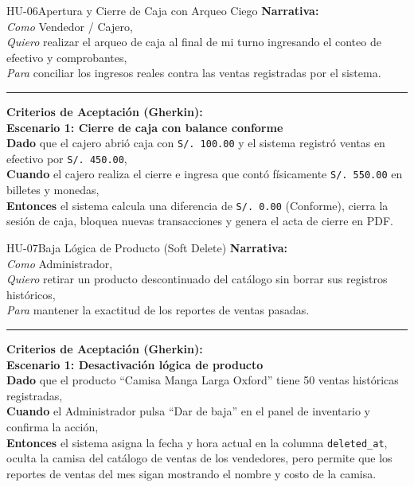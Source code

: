 \begin{hubox}{HU-06}{Apertura y Cierre de Caja con Arqueo Ciego}
\textbf{Narrativa:}\\
\textit{Como} Vendedor / Cajero,\\
\textit{Quiero} realizar el arqueo de caja al final de mi turno ingresando el conteo de efectivo y comprobantes,\\
\textit{Para} conciliar los ingresos reales contra las ventas registradas por el sistema.

\vspace{0.25cm}\hrule\vspace{0.25cm}
\textbf{Criterios de Aceptación (Gherkin):}\\
\textbf{Escenario 1: Cierre de caja con balance conforme}\\
\textbf{Dado} que el cajero abrió caja con \texttt{S/. 100.00} y el sistema registró ventas en efectivo por \texttt{S/. 450.00},\\
\textbf{Cuando} el cajero realiza el cierre e ingresa que contó físicamente \texttt{S/. 550.00} en billetes y monedas,\\
\textbf{Entonces} el sistema calcula una diferencia de \texttt{S/. 0.00} (Conforme), cierra la sesión de caja, bloquea nuevas transacciones y genera el acta de cierre en PDF.
\end{hubox}

\begin{hubox}{HU-07}{Baja Lógica de Producto (Soft Delete)}
\textbf{Narrativa:}\\
\textit{Como} Administrador,\\
\textit{Quiero} retirar un producto descontinuado del catálogo sin borrar sus registros históricos,\\
\textit{Para} mantener la exactitud de los reportes de ventas pasadas.

\vspace{0.25cm}\hrule\vspace{0.25cm}
\textbf{Criterios de Aceptación (Gherkin):}\\
\textbf{Escenario 1: Desactivación lógica de producto}\\
\textbf{Dado} que el producto ``Camisa Manga Larga Oxford'' tiene 50 ventas históricas registradas,\\
\textbf{Cuando} el Administrador pulsa ``Dar de baja'' en el panel de inventario y confirma la acción,\\
\textbf{Entonces} el sistema asigna la fecha y hora actual en la columna \texttt{deleted\_at}, oculta la camisa del catálogo de ventas de los vendedores, pero permite que los reportes de ventas del mes sigan mostrando el nombre y costo de la camisa.
\end{hubox}
